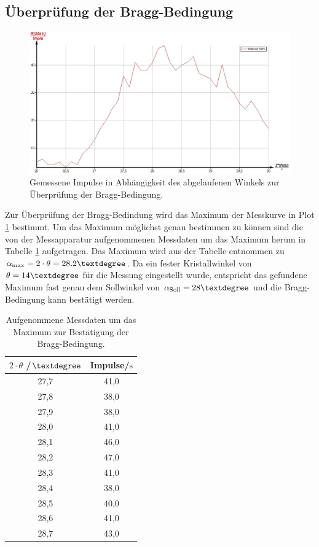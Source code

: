 \subsection{Überprüfung der Bragg-Bedingung}
\begin{figure}
	\centering
	\includegraphics[width=1.0\textwidth]{nIKO_und_jULIAN_ÜLADS/breck.jpg}
	\caption{Gemessene Impulse in Abhängigkeit des abgelaufenen Winkels zur Überprüfung der Bragg-Bedingung.}
	\label{fig:braeck}
\end{figure}
Zur Überprüfung der Bragg-Bedindung wird das Maximum der Messkurve in Plot \ref{fig:braeck} bestimmt.
Um das Maximum möglichst genau bestimmen zu können sind die von der Messapparatur aufgenommenen Messdaten um das Maximum herum in Tabelle \ref{tab:bregg} aufgetragen.
Das Maximum wird aus der Tabelle entnommen zu $\alpha_\mathrm{max}=2\cdot \theta=28.2\textdegree$.
Da ein fester Kristallwinkel von $\theta=14\textdegree$ für die Messung eingestellt wurde, entspricht das gefundene Maximum fast genau dem Sollwinkel von $\alpha_\mathrm{Soll}=28\textdegree$ und die Bragg-Bedingung kann bestätigt werden.
\begin{table}
	\centering
	\caption{Aufgenommene Messdaten um das Maximum zur Bestätigung der Bragg-Bedingung.}
	\label{tab:bregg}
	\begin{tabular} {cc}
		\toprule
		$2 \cdot \theta$ /$\textdegree$ &Impulse/$\si{\second}$ \\%
\midrule
		27,7	&41,0\\
		27,8	&38,0\\
		27,9	&38,0\\
		28,0	&41,0\\
		28,1	&46,0\\
		28,2	&47,0\\
		28,3	&41,0\\
		28,4	&38,0\\
		28,5	&40,0\\
		28,6	&41,0\\
		28,7	&43,0\\
\bottomrule
	\end{tabular}
\end{table}

